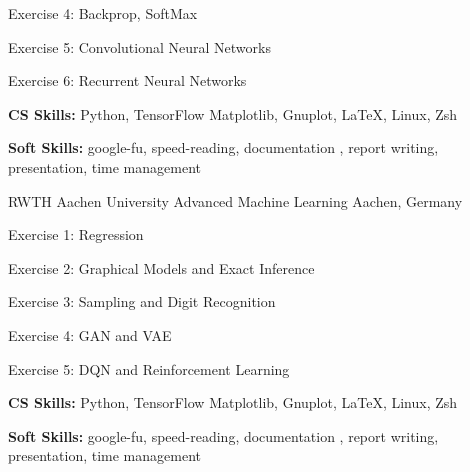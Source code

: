 \begin{cventries}
{\begin{cvitems}
      \item Exercise 4: Backprop, SoftMax
      \item Exercise 5: Convolutional Neural Networks
      \item Exercise 6: Recurrent Neural Networks
        \item {\textbf{CS Skills:} Python, TensorFlow Matplotlib, Gnuplot, LaTeX, Linux, Zsh}
        \item {\textbf{Soft Skills:} google-fu, speed-reading, documentation , report writing, presentation, time management}
      \end{cvitems}
    }
  \cventry
    {RWTH Aachen University} %
    {Advanced Machine Learning} %
    {Aachen, Germany} %
    {} %
    {
      \begin{cvitems} %
      \item Exercise 1: Regression
      \item Exercise 2: Graphical Models and Exact Inference
      \item Exercise 3: Sampling and Digit Recognition
      \item Exercise 4: GAN and VAE
      \item Exercise 5: DQN and Reinforcement Learning
        \item {\textbf{CS Skills:} Python, TensorFlow Matplotlib, Gnuplot, LaTeX, Linux, Zsh}
        \item {\textbf{Soft Skills:} google-fu, speed-reading, documentation , report writing, presentation, time management}
      \end{cvitems}
    }



\end{cventries}
